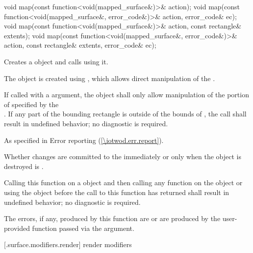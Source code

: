 \begin{itemdecl}
void map(const function<void(mapped_surface&)>& action);
void map(const function<void(mapped_surface&, error_code&)>& action, error_code& ec);
void map(const function<void(mapped_surface&)>& action, const rectangle& extents);
void map(const function<void(mapped_surface&, error_code&)>& action,
  const rectangle& extents, error_code& ec);
\end{itemdecl}
\begin{itemdescr}
\pnum
\effects
Creates a  object and calls  using it.

\pnum
The  object is created using , which allows direct manipulation of the \underlyingsurface.

\pnum
If called with a  argument, the  object shall only allow manipulation of the portion of  specified by the  \\
. If any part of the bounding rectangle is outside of the bounds of , the call shall result in undefined behavior; no diagnostic is required.

\pnum
\throws
As specified in Error reporting (\ref{\iotwod.err.report}).

\pnum
\remarks
Whether changes are committed to the \underlyingsurface immediately or only when the  object is destroyed is \unspecnorm.

\pnum
Calling this function on a  object and then calling any function on the  object or using the  object before the call to this function has returned shall result in undefined behavior; no diagnostic is required.

\pnum
\errors
The errors, if any, produced by this function are  or are produced by the user-provided function passed via the  argument.
\end{itemdescr}

 [\iotwod.surface.modifiers.render] { render modifiers}

